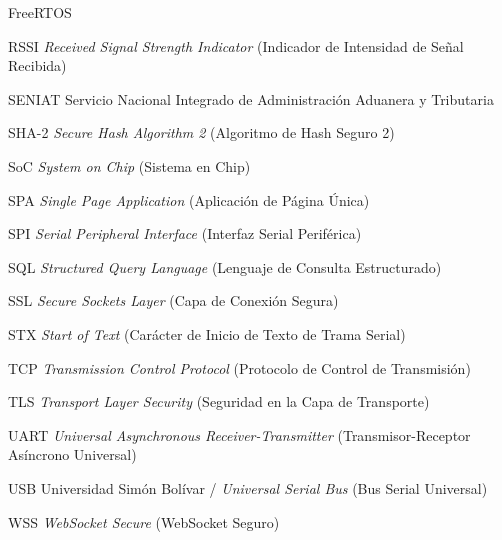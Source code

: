 \begin{acrolist}{FreeRTOS}
\item[RSSI] \textit{Received Signal Strength Indicator} (Indicador de Intensidad de Señal Recibida)
\item[SENIAT] Servicio Nacional Integrado de Administración Aduanera y Tributaria
\item[SHA-2] \textit{Secure Hash Algorithm 2} (Algoritmo de Hash Seguro 2)
\item[SoC] \textit{System on Chip} (Sistema en Chip)
\item[SPA] \textit{Single Page Application} (Aplicación de Página Única)
\item[SPI] \textit{Serial Peripheral Interface} (Interfaz Serial Periférica)
\item[SQL] \textit{Structured Query Language} (Lenguaje de Consulta Estructurado)
\item[SSL] \textit{Secure Sockets Layer} (Capa de Conexión Segura)
\item[STX] \textit{Start of Text} (Carácter de Inicio de Texto de Trama Serial)
\item[TCP] \textit{Transmission Control Protocol} (Protocolo de Control de Transmisión)
\item[TLS] \textit{Transport Layer Security} (Seguridad en la Capa de Transporte)
\item[UART] \textit{Universal Asynchronous Receiver-Transmitter} (Transmisor-Receptor Asíncrono Universal)
\item[USB] Universidad Simón Bolívar / \textit{Universal Serial Bus} (Bus Serial Universal)
\item[WSS] \textit{WebSocket Secure} (WebSocket Seguro)
\end{acrolist}
\clearpage
